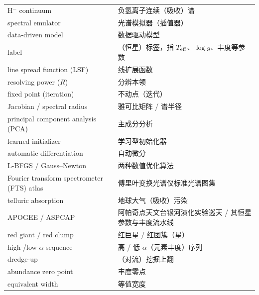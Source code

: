 \documentclass[11pt,a4paper,UTF8,fontset=fandol]{ctexart}
\begin{document}
\begin{longtable}{@{}p{}p{}@{}}
H$^-$ continuum & 负氢离子连续（吸收）谱 \\
spectral emulator & 光谱模拟器（插值器） \\
data-driven model & 数据驱动模型 \\
label & （恒星）标签，指 $T_{\rm eff}$、$\log g$、丰度等参数 \\
line spread function (LSF) & 线扩展函数 \\
resolving power ($R$) & 分辨本领 \\
fixed point (iteration) & 不动点（迭代） \\
Jacobian / spectral radius & 雅可比矩阵 / 谱半径 \\
principal component analysis (PCA) & 主成分分析 \\
learned initializer & 学习型初始化器 \\
automatic differentiation & 自动微分 \\
L-BFGS / Gauss--Newton & 两种数值优化算法 \\
Fourier transform spectrometer (FTS) atlas & 傅里叶变换光谱仪标准光谱图集 \\
telluric absorption & 地球大气（吸收）污染 \\
APOGEE / ASPCAP & 阿帕奇点天文台银河演化实验巡天 / 其恒星参数与丰度流水线 \\
red giant / red clump & 红巨星 / 红团簇（星） \\
high-/low-$\alpha$ sequence & 高 / 低 $\alpha$（元素丰度）序列 \\
dredge-up & （对流）挖掘上翻 \\
abundance zero point & 丰度零点 \\
equivalent width & 等值宽度 \\
\bottomrule
\end{longtable}















\end{document}
